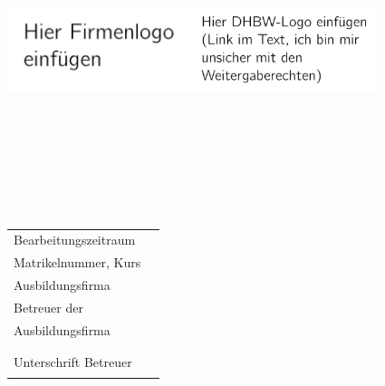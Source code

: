\begin{titlepage}
\includegraphics[height=2.5cm]{bilder/logo.png}\hfill\includegraphics[height=2.5cm]{bilder/dhbw.png}
\begin{center}
    \vspace*{\baselineskip}{\LARGE \textbf \titel}\\
    \\
    \\
    \\
    \\
    \vspace*{.25\baselineskip}{\Large \textbf \autor}\\
\end{center}
\vfill
\begin{tabularx}{\textwidth}{Xl}
    Bearbeitungszeitraum & \bearbeitung{} \\
    Matrikelnummer, Kurs & \matrikelnrkurs{} \\
    Ausbildungsfirma & \firma{} \\
    Betreuer der & \betreuer{} \\
    Ausbildungsfirma &\\
    &\\
    Unterschrift Betreuer & \rule{7cm}{1pt} \\
\end{tabularx}
\end{titlepage}
